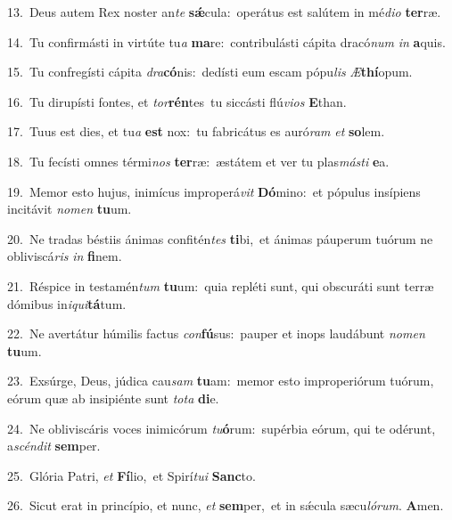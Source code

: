 {\numbfont\textcolor{\numbcolor}{13.}}~Deus autem Rex noster an\textit{te} \textbf{sǽ}\-cula:~\star operátus est salútem in mé\-\textit{di}\-\textit{o} \textbf{ter}\-ræ.\par
{\numbfont\textcolor{\numbcolor}{14.}}~Tu confirmásti in virtúte tu\textit{a} \textbf{ma}\-re:~\star contribulásti cápita dracó\textit{num} \textit{in} \textbf{a}\-quis.\par
{\numbfont\textcolor{\numbcolor}{15.}}~Tu confregísti cápita \textit{dra}\-\textbf{có}nis:~\star dedísti eum escam pópu\textit{lis} \textit{Æ}\-\textbf{thí}opum.\par
{\numbfont\textcolor{\numbcolor}{16.}}~Tu dirupísti fontes, et \textit{tor}\-\textbf{rén}tes~\star tu siccásti flú\-\textit{vi}\-\textit{os} \textbf{E}\-than.\par
{\numbfont\textcolor{\numbcolor}{17.}}~Tuus est dies, et tu\textit{a} \textbf{est} nox:~\star tu fabricátus es auró\textit{ram} \textit{et} \textbf{so}\-lem.\par
{\numbfont\textcolor{\numbcolor}{18.}}~Tu fecísti omnes térmi\textit{nos} \textbf{ter}\-ræ:~\star æstátem et ver tu plas\-\textit{más}\-\textit{ti} \textbf{e}\-a.\par
{\numbfont\textcolor{\numbcolor}{19.}}~Memor esto hujus, inimícus improperá\textit{vit} \textbf{Dó}\-mino:~\star et pópulus insípiens incitávit \textit{no}\-\textit{men} \textbf{tu}\-um.\par
{\numbfont\textcolor{\numbcolor}{20.}}~Ne tradas béstiis ánimas confitén\textit{tes} \textbf{ti}\-bi,~\star et ánimas páuperum tuórum ne obliviscá\textit{ris} \textit{in} \textbf{fi}\-nem.\par
{\numbfont\textcolor{\numbcolor}{21.}}~Réspice in testamén\textit{tum} \textbf{tu}\-um:~\star quia repléti sunt, qui obscuráti sunt terræ dómibus in\-\textit{i}\-\textit{qui}\textbf{tá}tum.\par
{\numbfont\textcolor{\numbcolor}{22.}}~Ne avertátur húmilis factus \textit{con}\-\textbf{fú}sus:~\star pauper et inops laudábunt \textit{no}\-\textit{men} \textbf{tu}\-um.\par
{\numbfont\textcolor{\numbcolor}{23.}}~Exsúrge, Deus, júdica cau\textit{sam} \textbf{tu}\-am:~\star memor esto improperiórum tuórum, eórum quæ ab insipiénte sunt \textit{to}\-\textit{ta} \textbf{di}\-e.\par
{\numbfont\textcolor{\numbcolor}{24.}}~Ne obliviscáris voces inimicórum \textit{tu}\-\textbf{ó}rum:~\star supérbia eórum, qui te odérunt, a\-\textit{scén}\-\textit{dit} \textbf{sem}\-per.\par
{\numbfont\textcolor{\numbcolor}{25.}}~Glória Patri, \textit{et} \textbf{Fí}\-lio,~\star et Spirí\-\textit{tu}\-\textit{i} \textbf{Sanc}\-to.\par
{\numbfont\textcolor{\numbcolor}{26.}}~Sicut erat in princípio, et nunc, \textit{et} \textbf{sem}\-per,~\star et in sǽcula sæcu\-\textit{ló}\-\textit{rum}. \textbf{A}\-men.\par
